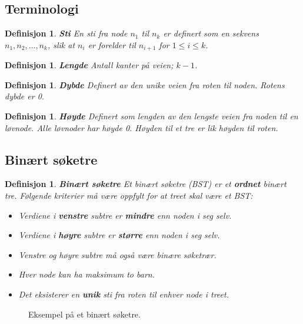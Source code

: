 \documentclass[11pt,a4paper]{article}
\theoremstyle{def}
\newtheorem{definition}[subsection]{Definisjon}
\begin{document}
\subsection{Terminologi}
\begin{definition}
\emph{\textbf{Sti}}
En sti fra node $n_1$ til $n_k$ er definert som en sekvens $n_1, n_2, \dots, n_k$, slik at $n_i$ er forelder til $n_{i+1}$ for $1 \leq i \leq k$.
\end{definition}
\begin{definition}
\emph{\textbf{Lengde}}
Antall \textit{kanter} på veien; $k-1$.
\end{definition}
\begin{definition}
\emph{\textbf{Dybde}}
Definert av den unike veien fra roten til noden. Rotens dybde er 0.
\end{definition}
\begin{definition}
\emph{\textbf{Høyde}}
Definert som lengden av den \textit{lengste} veien fra noden til en løvnode. Alle løvnoder har høyde 0. Høyden til et tre er lik høyden til roten.
\end{definition}


\newpage
\subsection{Binært søketre}

\begin{definition}
\emph{\textbf{Binært søketre}}
Et binært søketre (BST) er et \textbf{ordnet} binært tre. Følgende kriterier må være oppfylt for at treet skal være et BST:
\begin{itemize}
\item
Verdiene i \textbf{venstre} subtre er \textbf{mindre} enn noden i seg selv.
\item
Verdiene i \textbf{høyre} subtre er \textbf{større} enn noden i seg selv.
\item
Venstre og høyre subtre må også være binære søketrær.
\item
Hver node kan ha maksimum to barn.
\item
Det eksisterer en \textbf{unik} sti fra roten til enhver node i treet.
\end{itemize}
\end{definition}

\begin{figure}[h!]
\centering
{}
\label{fig:simplebst}
\caption{Eksempel på et binært søketre.}
\end{figure}
\end{document}
